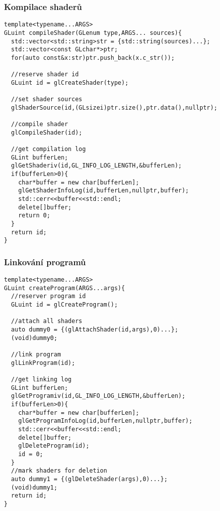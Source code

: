 \begin{frame}[fragile]
\frametitle{Kompilace shaderů}
    {\scriptsize
\begin{verbatim}
template<typename...ARGS>
GLuint compileShader(GLenum type,ARGS... sources){
  std::vector<std::string>str = {std::string(sources)...};
  std::vector<const GLchar*>ptr;
  for(auto const&x:str)ptr.push_back(x.c_str());

  //reserve shader id
  GLuint id = glCreateShader(type);

  //set shader sources
  glShaderSource(id,(GLsizei)ptr.size(),ptr.data(),nullptr);

  //compile shader
  glCompileShader(id);

  //get compilation log
  GLint bufferLen;
  glGetShaderiv(id,GL_INFO_LOG_LENGTH,&bufferLen);
  if(bufferLen>0){
    char*buffer = new char[bufferLen];
    glGetShaderInfoLog(id,bufferLen,nullptr,buffer);
    std::cerr<<buffer<<std::endl;
    delete[]buffer;
    return 0;
  }
  return id;
}
    \end{verbatim}
    }
\end{frame}

\begin{frame}[fragile]
\frametitle{Linkování programů}
    {\scriptsize
\begin{verbatim}
template<typename...ARGS>
GLuint createProgram(ARGS...args){
  //reserver program id
  GLuint id = glCreateProgram();

  //attach all shaders
  auto dummy0 = {(glAttachShader(id,args),0)...};
  (void)dummy0;

  //link program
  glLinkProgram(id);

  //get linking log
  GLint bufferLen;
  glGetProgramiv(id,GL_INFO_LOG_LENGTH,&bufferLen);
  if(bufferLen>0){
    char*buffer = new char[bufferLen];
    glGetProgramInfoLog(id,bufferLen,nullptr,buffer);
    std::cerr<<buffer<<std::endl;
    delete[]buffer;
    glDeleteProgram(id);
    id = 0;
  }
  //mark shaders for deletion
  auto dummy1 = {(glDeleteShader(args),0)...};
  (void)dummy1;
  return id;
}
    \end{verbatim}
    }
\end{frame}

